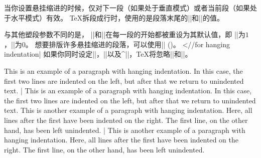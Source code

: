 当你设置悬挂缩进的时候，仅对下一段（如果处于垂直模式）或者当前段（如果处于水平模式）有效。
\TeX{}拆段成行时，使用的是段落末尾的|\hangafter|和|\hangindent|的值。
%


与其他塑段参数不同的是，
|\hangafter|和|\hangindent|在每一段的开始都被重设为其默认值，即
|\hangafter|为$1$，|\hangindent|为$0$。
想要排版许多悬挂缩进的段落，可以使用|\everypar| (\xref{\everypar})。
^^|\everypar//for hanging indentation|
如果你同时设定|\hangafter|，|\hangindent|以及^|\parshape|，\TeX{}将忽略|\hangafter|和|\hangindent|。

\example
\hangindent=6pc 
This is an example of a paragraph with hanging indentation. 
In this case, the first two lines are indented on the left,
but after that we return to unindented text.
|
\produces
\hangindent=6pc 
This is an example of a paragraph with hanging indentation. 
In this case, the first two lines are indented on the left,
but after that we return to unindented text.
\nextexample
\hangindent=-6pc 
This is another example of a paragraph with hanging
indentation.  Here, all lines after the first have been
indented on the right. The first line, on the other
hand, has been left unindented.
|
\produces
\hangindent=-6pc 
This is another example of a paragraph with hanging
indentation.  Here, all lines after the first have been
indented on the right. The first line, on the other
hand, has been left unindented.
\endexample
\enddesc

